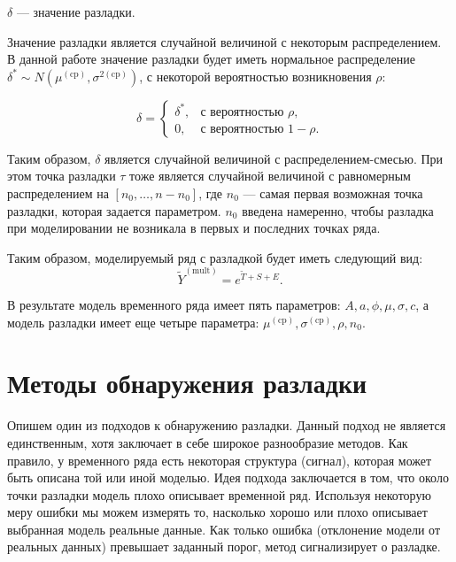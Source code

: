 \documentclass[%
12pt,
master,  %
natbib,      %
subf,        %
substylefile = spbu.rtx,
href,        %
colorlinks,  %
]{disser}
\begin{document}
$ \delta $  --- значение разладки.

Значение разладки является случайной величиной с некоторым распределением. В данной работе значение разладки будет иметь нормальное распределение $ \delta^* \sim N(\mu^{\mathrm{(cp)}}, \sigma^{2\mathrm{(cp)}})  $, с некоторой вероятностью возникновения $ \rho $:

\begin{equation*}
\delta = \begin{cases}
    		\delta^*, & \textrm{с вероятностью } \rho, \\
  		0, & \textrm{с вероятностью } 1 - \rho.
	\end{cases} 
\end{equation*}

Таким образом, $\delta$ является случайной величиной с распределением-смесью. При этом точка разладки  $\tau$ тоже является случайной величиной с равномерным распределением на $ [n_0, \dots, n - n_0 ] $, где $ n_0 $ --- самая первая возможная точка разладки, которая задается параметром. $n_0$ введена намеренно, чтобы разладка при моделировании не возникала в первых и последних точках ряда.

Таким образом, моделируемый ряд с разладкой будет иметь следующий вид:
\begin{equation*}
\tilde{Y}^{\mathrm{(mult)}} = e^{\tilde{T} + S + E}. 
\end{equation*}

В результате модель временного ряда имеет пять параметров: $ A, a, \phi, \mu, \sigma, c $, а модель разладки имеет еще четыре параметра: $ \mu^{\mathrm{(cp)}}, \sigma^{\mathrm{(cp)}}, \rho, n_0 $.

\section{Методы обнаружения разладки}


Опишем один из подходов к обнаружению разладки. Данный подход не является единственным, хотя заключает в себе широкое разнообразие методов. Как правило, у временного ряда есть некоторая структура (сигнал), которая может быть описана той или иной моделью. Идея подхода заключается в том, что около точки разладки модель плохо описывает временной ряд. Используя некоторую меру ошибки мы можем измерять то, насколько хорошо или плохо описывает выбранная модель реальные данные. Как только ошибка (отклонение модели от реальных данных) превышает заданный порог, метод сигнализирует о разладке.
\end{document}
